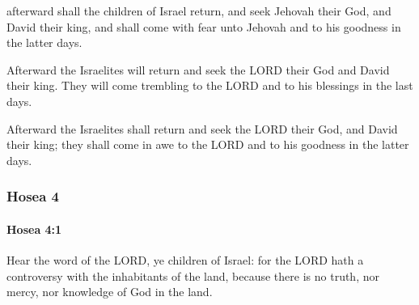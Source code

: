 			\begin{versebox}
					\item[BHS] 
					\item[LXX] 
					\item[ASV] afterward shall the children of Israel return, and seek Jehovah their God, and David their king, and shall come with fear unto Jehovah and to his goodness in the latter days.
					\item[NIV] Afterward the Israelites will return and seek the LORD their God and David their king. They will come trembling to the LORD and to his blessings in the last days.
					\item[NRSV] Afterward the Israelites shall return and seek the LORD their God, and David their king; they shall come in awe to the LORD and to his goodness in the latter days.
			\end{versebox}
	\subsubsection{Hosea 4} %
		\label{HOSEA-4}

		\paragraph{Hosea 4:1} %
			\label{HOSEA-4-1}

			Hear the word of the LORD, ye children of Israel: for the LORD hath a controversy with the inhabitants of the land, because there is no truth, nor mercy, nor knowledge of God in the land.

